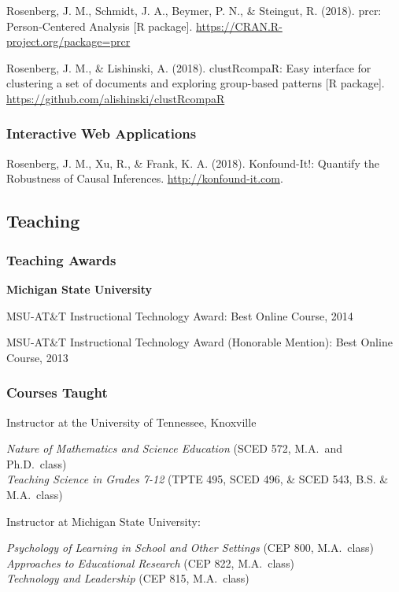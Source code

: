 \documentclass[14,]{article}
\begin{document}
Rosenberg, J. M., Schmidt, J. A., Beymer, P. N., \& Steingut, R. (2018).
prcr: Person-Centered Analysis {[}R package{]}.
\url{https://CRAN.R-project.org/package=prcr}

Rosenberg, J. M., \& Lishinski, A. (2018). clustRcompaR: Easy interface
for clustering a set of documents and exploring group-based patterns
{[}R package{]}. \url{https://github.com/alishinski/clustRcompaR}

\subsubsection{Interactive Web
Applications}\label{interactive-web-applications}

Rosenberg, J. M., Xu, R., \& Frank, K. A. (2018). Konfound-It!: Quantify
the Robustness of Causal Inferences. \url{http://konfound-it.com}.

\subsection{Teaching}\label{teaching}

\subsubsection{Teaching Awards}\label{teaching-awards}

\textbf{Michigan State University}

MSU-AT\&T Instructional Technology Award: Best Online Course, 2014

MSU-AT\&T Instructional Technology Award (Honorable Mention): Best
Online Course, 2013

\subsubsection{Courses Taught}\label{courses-taught}

Instructor at the University of Tennessee, Knoxville

\emph{Nature of Mathematics and Science Education} (SCED 572, M.A.~and
Ph.D.~class)\\
\emph{Teaching Science in Grades 7-12} (TPTE 495, SCED 496, \& SCED 543,
B.S. \& M.A.~class)

Instructor at Michigan State University:

\emph{Psychology of Learning in School and Other Settings} (CEP 800,
M.A.~class)\\
\emph{Approaches to Educational Research} (CEP 822, M.A.~class)\\
\emph{Technology and Leadership} (CEP 815, M.A.~class)
\end{document}
